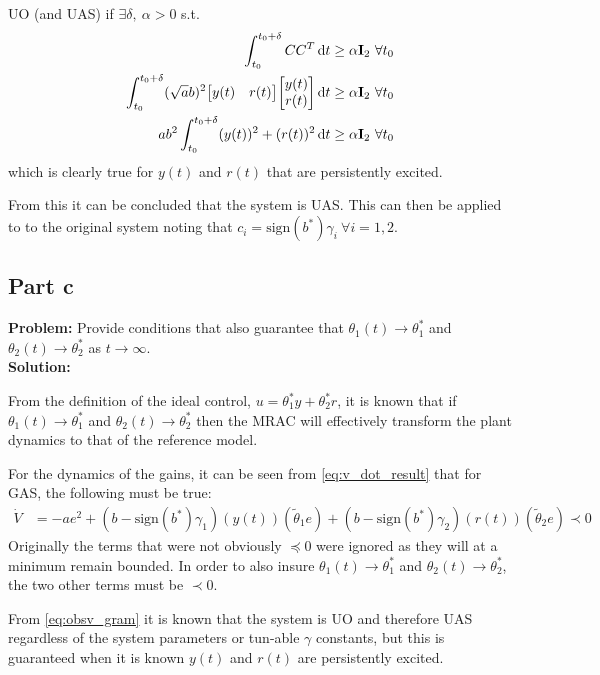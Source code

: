\documentclass[letter]{article}
\begin{document}
UO (and UAS) if $\exists \delta, \ \alpha > 0$ s.t.
\begin{align}
	\int_{t_0}^{t_0+\delta} C C^T \dd{t}
	&\geq \alpha \vb{I}_2 \ \forall t_0\\
	\int_{t_0}^{t_0+\delta} (\sqrt{a} b)^2 \mqty[y(t) & r(t)] \mqty[y(t) \\ r(t)]  \dd{t}
	&\geq \alpha \vb{I}_2 \ \forall t_0\\
	a b^2 \int_{t_0}^{t_0+\delta} (y(t))^2 + (r(t))^2 \dd{t}
	&\geq \alpha \vb{I}_2 \ \forall t_0\label{eq:obsv_gram}
\end{align}
which is clearly true for $y(t)$ and $r(t)$ that are persistently excited.

From this it can be concluded that the system is UAS. This can then be applied to to the original system noting that $c_i = \text{sign}(b^*) \gamma_i \ \forall i = 1,2$.


\newpage
\subsection{Part c}
\textbf{Problem:}
Provide conditions that also guarantee that $\theta_1(t) \to \theta_1^*$ and $\theta_2(t) \to \theta_2^*$ as $t\to\infty$.\\

\noindent
\textbf{Solution:}

From the definition of the ideal control, $u = \theta_1^* y + \theta_2^* r$, it is known that if $\theta_1(t) \to \theta_1^*$ and $\theta_2(t) \to \theta_2^*$ then the MRAC will effectively transform the plant dynamics to that of the reference model.

For the dynamics of the gains, it can be seen from \eqref{eq:v_dot_result} that for GAS, the following must be true:
\begin{align}
	\dot{V} &= -a e^2 + (b-\text{sign}(b^*) \gamma_1) (y(t)) (\tilde{\theta}_1 e) + (b - \text{sign}(b^*) \gamma_2) (r(t)) (\tilde{\theta}_2 e) \prec 0
\end{align}
Originally the terms that were not obviously $\preceq 0$ were ignored as they will at a minimum remain bounded. In order to also insure $\theta_1(t) \to \theta_1^*$ and $\theta_2(t) \to \theta_2^*$, the two other terms must be $\prec 0$.

From \eqref{eq:obsv_gram} it is known that the system is UO and therefore UAS regardless of the system parameters or tun-able $\gamma$ constants, but this is guaranteed when it is known $y(t)$ and $r(t)$ are persistently excited.
\end{document}
